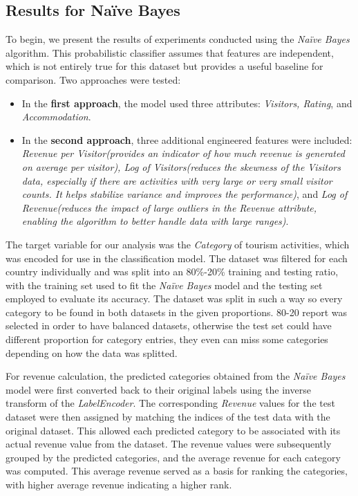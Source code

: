 \documentclass{article}
\begin{document}
\subsection{Results for Na\"{i}ve Bayes}

To begin, we present the results of experiments conducted using the \textit{Na\"{i}ve Bayes} algorithm. This probabilistic classifier assumes that features are independent, which is not entirely true for this dataset but provides a useful baseline for comparison. Two approaches were tested:
\begin{itemize}
    \item In the \textbf{first approach}, the model used three attributes: \textit{Visitors, Rating}, and \textit{Accommodation}.
    \item In the \textbf{second approach}, three additional engineered features were included: \textit{Revenue per Visitor(provides an indicator of how much revenue is generated on average per visitor), Log of Visitors(reduces the skewness of the Visitors data, especially if there are activities with very large or very small visitor counts. It helps stabilize variance and improves the performance)}, and \textit{Log of Revenue(reduces the impact of large outliers in the Revenue attribute, enabling the algorithm to better handle data with large ranges)}.
\end{itemize}

The target variable for our analysis was the \textit{Category} of tourism activities, which was encoded for use in the classification model. The dataset was filtered for each country individually and  was split into an 80\%-20\% training and testing ratio, with the training set used to fit the \textit{Na\"{i}ve Bayes} model and the testing set employed to evaluate its accuracy. The dataset was split in such a way so every category to be found in both datasets in the given proportions. 80-20 report was selected in order to have balanced datasets, otherwise the test set could have different proportion for category entries, they even can miss some categories depending on how the data was splitted.

For revenue calculation, the predicted categories obtained from the \textit{Na\"{i}ve Bayes} model were first converted back to their original labels using the inverse transform of the \textit{LabelEncoder}. The corresponding \textit{Revenue} values for the test dataset were then assigned by matching the indices of the test data with the original dataset. This allowed each predicted category to be associated with its actual revenue value from the dataset. The revenue values were subsequently grouped by the predicted categories, and the average revenue for each category was computed. This average revenue served as a basis for ranking the categories, with higher average revenue indicating a higher rank.
\end{document}
